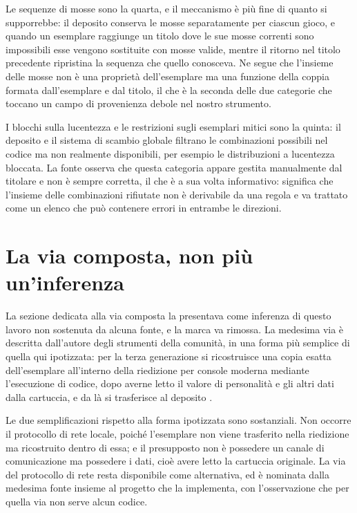 Le sequenze di mosse sono la quarta, e il meccanismo è più fine di quanto si supporrebbe: il deposito conserva le mosse separatamente per ciascun gioco, e quando un esemplare raggiunge un titolo dove le sue mosse correnti sono impossibili esse vengono sostituite con mosse valide, mentre il ritorno nel titolo precedente ripristina la sequenza che quello conosceva. Ne segue che l'insieme delle mosse non è una proprietà dell'esemplare ma una funzione della coppia formata dall'esemplare e dal titolo, il che è la seconda delle due categorie che toccano un campo di provenienza debole nel nostro strumento.

I blocchi sulla lucentezza e le restrizioni sugli esemplari mitici sono la quinta: il deposito e il sistema di scambio globale filtrano le combinazioni possibili nel codice ma non realmente disponibili, per esempio le distribuzioni a lucentezza bloccata. La fonte osserva che questa categoria appare gestita manualmente dal titolare e non è sempre corretta, il che è a sua volta informativo: significa che l'insieme delle combinazioni rifiutate non è derivabile da una regola e va trattato come un elenco che può contenere errori in entrambe le direzioni.

\section{La via composta, non più un'inferenza}

La sezione dedicata alla via composta la presentava come inferenza di questo lavoro non sostenuta da alcuna fonte, e la marca va rimossa. La medesima via è descritta dall'autore degli strumenti della comunità, in una forma più semplice di quella qui ipotizzata: per la terza generazione si ricostruisce una copia esatta dell'esemplare all'interno della riedizione per console moderna mediante l'esecuzione di codice, dopo averne letto il valore di personalità e gli altri dati dalla cartuccia, e da là si trasferisce al deposito \cite{mankeymite-server}.

Le due semplificazioni rispetto alla forma ipotizzata sono sostanziali. Non occorre il protocollo di rete locale, poiché l'esemplare non viene trasferito nella riedizione ma ricostruito dentro di essa; e il presupposto non è possedere un canale di comunicazione ma possedere i dati, cioè avere letto la cartuccia originale. La via del protocollo di rete resta disponibile come alternativa, ed è nominata dalla medesima fonte insieme al progetto che la implementa, con l'osservazione che per quella via non serve alcun codice.

